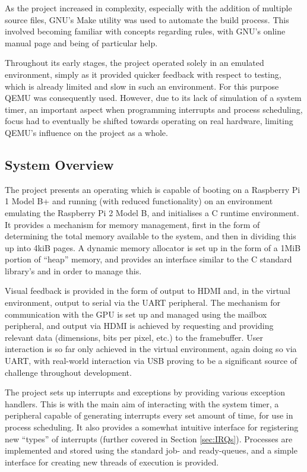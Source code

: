         As the project increased in complexity, especially with the addition of
        multiple source files, GNU's Make utility was used to automate the build
        process. This involved becoming familiar with concepts regarding rules,
        with GNU's online manual page \cite{MakeManual} and \cite{MakeVariables}
        being of particular help.

        Throughout its early stages, the project operated solely in an emulated
        environment, simply as it provided quicker feedback with respect to
        testing, which is already limited and slow in such an environment.
        For this purpose QEMU was consequently used. However, due to its lack of
        simulation of a system timer, an important aspect when programming
        interrupts and process scheduling, focus had to eventually be shifted
        towards operating on real hardware, limiting QEMU's influence on the
        project as a whole.
 
\subsection{System Overview}
    The project presents an operating which is capable of booting on a Raspberry
    Pi 1 Model B+ and running (with reduced functionality) on an environment
    emulating the Raspberry Pi 2 Model B, and initialises a C runtime
    environment. It provides a mechanism for memory management, first in the
    form of determining the total memory available to the system, and then in
    dividing this up into 4kiB pages. A dynamic memory allocator is set up in
    the form of a 1MiB portion of ``heap'' memory, and provides an interface
    similar to the C standard library's  and  in
    order to manage this.

    Visual feedback is provided in the form of output to HDMI and, in the
    virtual environment, output to serial via the UART peripheral.  The
    mechanism for communication with the GPU is set up and managed using the
    mailbox peripheral, and output via HDMI is achieved by requesting and
    providing relevant data (dimensions, bits per pixel, etc.) to the
    framebuffer. User interaction is so far only achieved in the virtual
    environment, again doing so via UART, with real-world interaction via USB
    proving to be a significant source of challenge throughout development.

    The project sets up interrupts and exceptions by providing various exception
    handlers. This is with the main aim of interacting with the system timer, a
    peripheral capable of generating interrupts every set amount of time, for
    use in process scheduling. It also provides a somewhat intuitive interface
    for registering new ``types'' of interrupts (further covered in Section
    \ref{sec:IRQs}). Processes are implemented and stored using the standard
    job- and ready-queues, and a simple interface for creating new threads of
    execution is provided.

